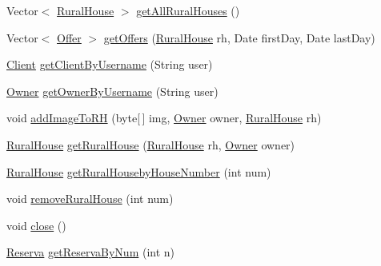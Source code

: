 \begin{DoxyCompactItemize}
\item 
Vector$<$ \mbox{\hyperlink{classdomain_1_1_rural_house}{Rural\+House}} $>$ \mbox{\hyperlink{interfacebusiness_logic_1_1_application_facade_interface_w_s_a553cbfb37ea9f1621ba76ad8308a15da}{get\+All\+Rural\+Houses}} ()
\item 
Vector$<$ \mbox{\hyperlink{classdomain_1_1_offer}{Offer}} $>$ \mbox{\hyperlink{interfacebusiness_logic_1_1_application_facade_interface_w_s_ae338a96d039003c64fceb68d667736f1}{get\+Offers}} (\mbox{\hyperlink{classdomain_1_1_rural_house}{Rural\+House}} rh, Date first\+Day, Date last\+Day)
\item 
\mbox{\hyperlink{classdomain_1_1_client}{Client}} \mbox{\hyperlink{interfacebusiness_logic_1_1_application_facade_interface_w_s_a0d69ed91aa71325dedc777f059999e93}{get\+Client\+By\+Username}} (String user)
\item 
\mbox{\hyperlink{classdomain_1_1_owner}{Owner}} \mbox{\hyperlink{interfacebusiness_logic_1_1_application_facade_interface_w_s_a0f38b3b41794e2ec57b019b89ef255c3}{get\+Owner\+By\+Username}} (String user)
\item 
void \mbox{\hyperlink{interfacebusiness_logic_1_1_application_facade_interface_w_s_ad5cf462151e6c43b9088f112eed0ad3f}{add\+Image\+To\+RH}} (byte\mbox{[}$\,$\mbox{]} img, \mbox{\hyperlink{classdomain_1_1_owner}{Owner}} owner, \mbox{\hyperlink{classdomain_1_1_rural_house}{Rural\+House}} rh)
\item 
\mbox{\hyperlink{classdomain_1_1_rural_house}{Rural\+House}} \mbox{\hyperlink{interfacebusiness_logic_1_1_application_facade_interface_w_s_aeda86c46b75acfc4befb30f5d0e98e7c}{get\+Rural\+House}} (\mbox{\hyperlink{classdomain_1_1_rural_house}{Rural\+House}} rh, \mbox{\hyperlink{classdomain_1_1_owner}{Owner}} owner)
\item 
\mbox{\hyperlink{classdomain_1_1_rural_house}{Rural\+House}} \mbox{\hyperlink{interfacebusiness_logic_1_1_application_facade_interface_w_s_a686ca441b89f52085ef66d00f10c6854}{get\+Rural\+Houseby\+House\+Number}} (int num)
\item 
void \mbox{\hyperlink{interfacebusiness_logic_1_1_application_facade_interface_w_s_a472d0eae303dc4ad989f382bb0632afc}{remove\+Rural\+House}} (int num)
\item 
void \mbox{\hyperlink{interfacebusiness_logic_1_1_application_facade_interface_w_s_a8cbc91e14e6abf2d7577ba2c69f4b48f}{close}} ()
\item 
\mbox{\hyperlink{classdomain_1_1_reserva}{Reserva}} \mbox{\hyperlink{interfacebusiness_logic_1_1_application_facade_interface_w_s_a1ee7d830657be2563a277591c150f273}{get\+Reserva\+By\+Num}} (int n)

\end{DoxyCompactItemize}
